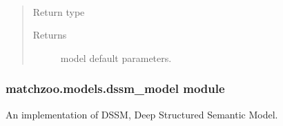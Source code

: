 \documentclass[letterpaper,10pt,english]{sphinxmanual}
\begin{document}
\begin{fulllineitems}
\begin{fulllineitems}
\label{\detokenize{matchzoo.models:matchzoo.models.dense_baseline_model.DenseBaselineModel.get_default_params}}~\begin{quote}\begin{description}
\item[{Return type}] \leavevmode
{\hyperref[\detokenize{matchzoo.engine:matchzoo.engine.param_table.ParamTable}]{}}

\item[{Returns}] \leavevmode
model default parameters.

\end{description}\end{quote}

\end{fulllineitems}


\end{fulllineitems}



\subsubsection{matchzoo.models.dssm\_model module}
\label{\detokenize{matchzoo.models:module-matchzoo.models.dssm_model}}\label{\detokenize{matchzoo.models:matchzoo-models-dssm-model-module}}
An implementation of DSSM, Deep Structured Semantic Model.
\end{document}
